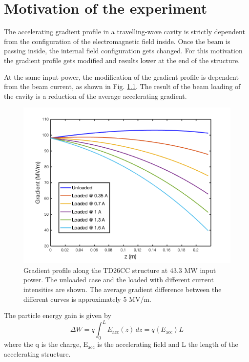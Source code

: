 \chapter[Motivation of the experiment]{Motivation of the experiment}

The accelerating gradient profile in a travelling-wave cavity is strictly dependent from the configuration of the electromagnetic field inside. Once the beam is passing inside, the internal field configuration gets changed. For this motivation the gradient profile gets modified and results lower at the end of the structure.

At the same input power, the modification of the gradient profile is dependent from the beam current, as shown in Fig. \ref{grad_vs_I}. The result of the beam loading of the cavity is a reduction of the average accelerating gradient.

\begin{figure}[h]
\centering 
\includegraphics[scale=0.5]{pictures/Gradient_vs_current.png}
\caption{Gradient profile along the TD26CC structure at 43.3 MW input power. The unloaded case and the loaded with different current intensities are shown. The average gradient difference between the different curves is approximately 5 MV/m.}
\label{grad_vs_I}
\end{figure}
The particle energy gain is given by 
\begin{equation}
\Delta W  = q \int_0^L E_{\text{acc}} (z) \, dz = q \left \langle E_{\text{acc}} \right \rangle L
\label{en_gain}
\end{equation}
where the q is the charge, E$_{\text{acc}}$ is the accelerating field and L the length of the accelerating structure.

